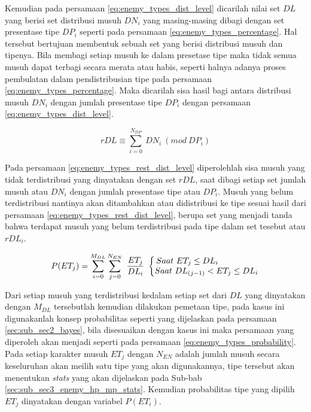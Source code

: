 Kemudian pada persamaan \ref{eq:enemy_types_dist_level} dicarilah nilai set $DL$ yang berisi set distribusi musuh $DN_{i}$ yang masing-masing dibagi dengan set presentase tipe $DP_{i}$ seperti pada persamaan \ref{eq:enemy_types_percentage}. Hal tersebut bertujuan membentuk sebuah set yang berisi distribusi musuh dan tipenya. Bila membagi setiap musuh ke dalam presetase tipe maka tidak semua musuh dapat terbagi secara merata atau habis, seperti halnya adanya proses pembulatan dalam pendistribusian tipe pada persamaan \ref{eq:enemy_types_percentage}. Maka dicarilah sisa hasil bagi antara distribusi musuh $DN_{i}$ dengan jumlah presentase tipe $DP_{i}$ dengan persamaan \ref{eq:enemy_types_dist_level}.
\vspace{1ex}

\begin{equation}\label{eq:enemy_types_rest_dist_level}
rDL \equiv \sum_{i = 0}^{N_{DP}}\ DN_{i}\ (mod\ DP_{i})
\end{equation}

Pada persamaan \ref{eq:enemy_types_rest_dist_level} diperolehlah sisa musuh yang tidak terdistribusi yang dinyatakan dengan set $rDL$, saat dibagi setiap set jumlah musuh atau $DN_{i}$ dengan jumlah presentase tipe atau $DP_{i}$. Musuh yang belum terdistribusi nantinya akan ditambahkan atau didistribusi ke tipe sesuai hasil dari persamaan \ref{eq:enemy_types_rest_dist_level}, berupa set yang menjadi tanda bahwa terdapat musuh yang belum terdistribusi pada tipe dalam set tesebut atau $rDL_{i}$.
\vspace{1ex}

\begin{equation}\label{eq:enemy_types_probability}
P(ET_{j}) = \sum_{i = 0}^{M_{DL}} \sum_{j = 0}^{N_{EN}}\ \frac{ET_{j}}{DL_{i}}\
\left\{\begin{matrix}
\hspace{-4.6em} Saat\ ET_{j} \leq DL_{i} \\ 
Saat\ DL_{(j-1)} < ET_{j} \leq DL_{i}
\end{matrix}\right.
\end{equation}

Dari setiap musuh yang terdistribusi kedalam setiap set dari $DL$ yang dinyatakan dengan $M_{DL}$ tersebutlah kemudian dilakukan pemetaan tipe, pada kasus ini digunakanlah konsep probabilitas seperti yang dijelaskan pada persamaan \ref{sec:sub_sec2_bayes}, bila disesuaikan dengan kasus ini maka persamaan yang diperoleh akan menjadi seperti pada persamaan \ref{eq:enemy_types_probability}. Pada setiap karakter musuh $ET_{j}$ dengan $N_{EN}$ adalah jumlah musuh secara keseluruhan akan meilih satu tipe yang akan digunakannya, tipe tersebut akan menentukan \textit{stats} yang akan dijelaskan pada Sub-bab \ref{sec:sub_sec3_enemy_hp_mp_stats}. Kemudian probabilitas tipe yang dipilih $ET_{j}$ dinyatakan dengan variabel $P(ET_{i})$.
\vspace{1ex}

